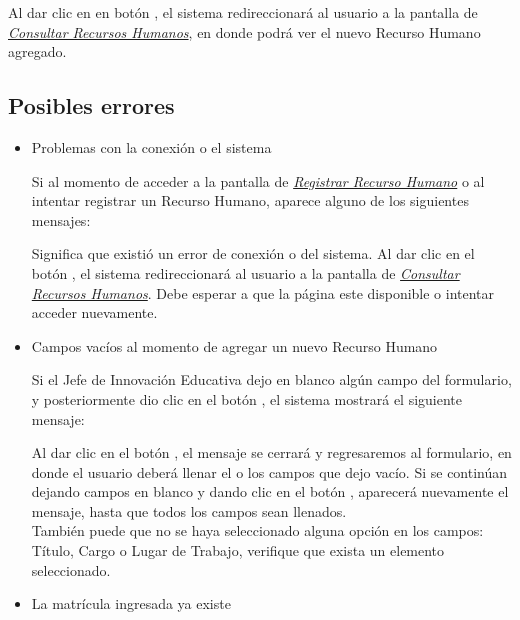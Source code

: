         Al dar clic en en botón , el sistema redireccionará al usuario a la pantalla de \hyperlink{consultarrh}{\textit{Consultar Recursos Humanos}}, en donde podrá ver el nuevo Recurso Humano agregado.\\

        \subsection{Posibles errores}
            \begin{itemize}
            
            	\item Problemas con la conexión o el sistema
                
                	Si al momento de acceder a la pantalla de \hyperlink{registrarrh}{\textit{Registrar Recurso Humano}} o al intentar registrar un Recurso Humano, aparece alguno de los siguientes mensajes:
                
                	Significa que existió un error de conexión o del sistema. Al dar clic en el botón , el sistema redireccionará al usuario a la pantalla de \hyperlink{consultarrh}{\textit{Consultar Recursos Humanos}}. Debe esperar a que la página este disponible o intentar acceder nuevamente.
                
            	\item Campos vacíos al momento de agregar un nuevo Recurso Humano
            
                	Si el Jefe de Innovación Educativa dejo en blanco algún campo del formulario, y posteriormente dio clic en el botón , el sistema mostrará el siguiente mensaje:
                
                	Al dar clic en el botón , el mensaje se cerrará y regresaremos al formulario, en donde el usuario deberá llenar el o los campos que dejo vacío. Si se continúan dejando campos en blanco y dando clic en el botón , aparecerá nuevamente el mensaje, hasta que todos los campos sean llenados.\\
                
                	También puede que no se haya seleccionado alguna opción en los campos: Título, Cargo o Lugar de Trabajo, verifique que exista un elemento seleccionado.
                
            	\item La matrícula ingresada ya existe
            

\end{itemize}
